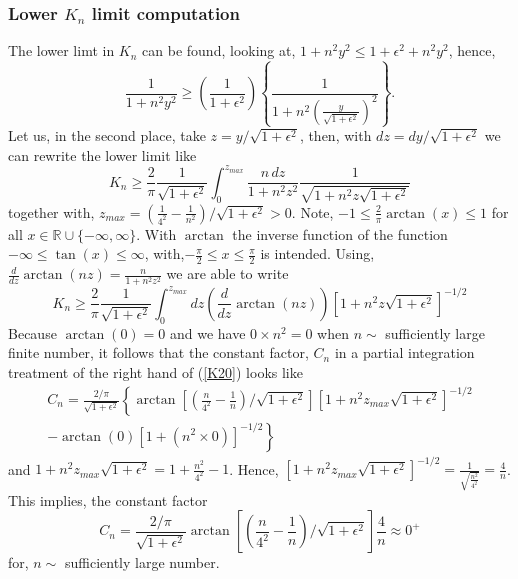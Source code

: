 \documentclass{appolb}
\begin{document}
\subsubsection{Lower $K_n$ limit computation}
The lower limt in $K_n$ can be found, looking at, $1+n^2y^2\leq 1+ \epsilon^2 + n^2y^2$, hence,
\[
\frac{1}{1+n^2y^2} \geq \left( \frac{1}{1+\epsilon^2}\right) \left\{ \frac{1}{1+n^2\left( \frac{y}{\sqrt{1+\epsilon^2}}\right)^2}\right\}.
\]
Let us, in the second place, take $z=y/\sqrt{1+\epsilon^2}$, then, with $dz=dy/\sqrt{1+\epsilon^2}$ we can rewrite the lower limit like
\begin{equation}\label{K19}
K_n \geq \frac{2}{\pi} \frac{1}{\sqrt{1+\epsilon^2}}\int_0^{z_{max}}\frac{n\,dz}{1+n^2z^2}\frac{1}{\sqrt{1+n^2z\sqrt{1+\epsilon^2}}}
\end{equation}
together with, $z_{max}=\left( \frac{1}{4^2}-\frac{1}{n^2} \right)/\sqrt{1+\epsilon^2}>0$. Note, $-1\leq \frac{2}{\pi} \arctan(x) \leq 1$ for all $x \in \mathbb{R}\cup\{-\infty,\infty\}$. With $\arctan$ the inverse function of the function $-\infty \leq \tan(x) \leq \infty$, with,$-\frac{\pi}{2}\leq x \leq \frac{\pi}{2}$ is intended. Using, $\frac{d}{dz}\arctan(nz)=\frac{n}{1+n^2z^2}$ we are able to write
\begin{equation}\label{K20}
K_n \geq \frac{2}{\pi} \frac{1}{\sqrt{1+\epsilon^2}}\int_0^{z_{max}}dz \left( 
\frac{d}{dz}\arctan(nz)\right)\left[ 1+n^2z\sqrt{1+\epsilon^2} \right]^{-1/2}
\end{equation}
Because $\arctan(0)=0$ and we have $0\times n^2=0$ when $n\sim $ sufficiently large finite number, it follows that the constant factor, $C_n$ in a partial integration treatment of the right hand of (\ref{K20}) looks like
\begin{eqnarray}\label{constant}
C_n=\frac{2/\pi}{\sqrt{1+\epsilon^2}}\left\{ \arctan\left[ \left( \frac{n}{4^2}-\frac{1}{n}\right)/\sqrt{1+\epsilon^2}\right]\left[ 1+n^2z_{max}\sqrt{1+\epsilon^2} \right]^{-1/2}\right.
\nonumber\\
-\left.\arctan(0)[1+(n^2 \times 0)]^{-1/2} \right\}
\end{eqnarray}
and $1+n^2z_{max}\sqrt{1+\epsilon^2} = 1+\frac{n^2}{4^2}-1$. Hence, $\left[ 1+n^2z_{max}\sqrt{1+\epsilon^2} \right]^{-1/2}=\frac{1}{\sqrt{\frac{n^2}{4^2}}}=\frac{4}{n}$. 
This implies, the constant factor 
\[C_n=\frac{2/\pi}{\sqrt{1+\epsilon^2}}\arctan\left[ \left( \frac{n}{4^2}-\frac{1}{n}\right)/\sqrt{1+\epsilon^2}\right]\frac{4}{n} \approx 0^{+}  \] for, $n\sim$ sufficiently large number. 
\end{document}
